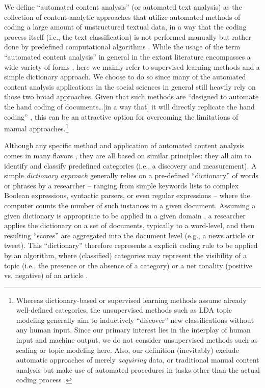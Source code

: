 \documentclass[man, 12pt, a4paper, nolmodern, noextraspace]{apa6}
\begin{document}
    We define \enquote{automated content analysis} (or automated text analysis) as the collection of content-analytic approaches that utilize automated methods of coding a large amount of unstructured textual data, in a way that the coding process itself (i.e., the text classification) is not performed manually but rather done by predefined computational algorithms \parencite{trilling2018scaling, grimmer2013text}. While the usage of the term \enquote{automated content analysis} in general in the extant literature encompasses a wide variety of forms \parencites[e.g.,][]{riff2014analyzing, Hopkins_King2010, Krippendorff2013, grimmer2013text}, here we mainly refer to supervised learning methods and a simple dictionary approach. We choose to do so since many of the automated content analysis applications in the social sciences in general still heavily rely on those two broad approaches. Given that such methods are \enquote{designed to automate the hand coding of documents\ldots[in a way that] it will directly replicate the hand coding} \parencites[][p. 13]{grimmer2013text}, this can be an attractive option for overcoming the limitations of manual approaches.\footnote{ Whereas dictionary-based or supervised learning methods assume already well-defined categories, the unsupervised methods such as LDA topic modeling \parencites[][]{dimaggio2013exploiting, maier2018applying} generally aim to inductively \enquote{discover} new classifications without any human input. Since our primary interest lies in the interplay of human input and machine output, we do not consider unsupervised methods such as scaling or topic modeling here. Also, our definition (inevitably) exclude automatic approaches of merely \textit{acquiring} data, or traditional manual content analysis but make use of automated procedures in tasks other than the actual coding process \parencites[such as in data entry or data management: e.g.,][]{lewis2013content}.}
    
    Although any specific method and application of automated content analysis comes in many flavors \parencites[for a broad overview, see:][]{Boumans_Trilling_2016, grimmer2013text}, they are all based on similar principles: they all aim to identify and classify predefined categories (i.e., a discovery and measurement). A simple \textit{dictionary approach} generally relies on a pre-defined “dictionary” of words or phrases by a researcher -- ranging from simple keywords lists to complex Boolean expressions, syntactic parsers, or even regular expressions -- where the computer counts the number of such instances in a given document. Assuming a given dictionary is appropriate to be applied in a given domain \parencite{Boumans_Trilling_2016, gonzalez2015signals}, a researcher applies the dictionary on a set of documents, typically to a word-level, and then resulting \enquote{scores} are aggregated into the document level (e.g., a news article or tweet). This \enquote{dictionary} therefore represents a explicit coding rule to be applied by an algorithm, where (classified) categories may represent the visibility of a topic (i.e., the presence or the absence of a category) or a net tonality (positive vs. negative) of an article \parencites[e.g.,][]{Aaldering2016, YoungSoroka2012, boomgaaden2009, gonzalez2015signals, Rooduijn2011}. 
    
\end{document}
